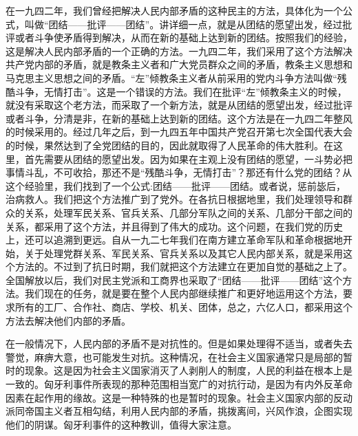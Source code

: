 在一九四二年，我们曾经把解决人民内部矛盾的这种民主的方法，具体化为一个公式，叫做“团结——批评——团结”。讲详细一点，就是从团结的愿望出发，经过批评或者斗争使矛盾得到解决，从而在新的基础上达到新的团结。按照我们的经验，这是解决人民内部矛盾的一个正确的方法。一九四二年，我们采用了这个方法解决共产党内部的矛盾，就是教条主义者和广大党员群众之间的矛盾，教条主义思想和马克思主义思想之间的矛盾。“左”倾教条主义者从前采用的党内斗争方法叫做“残酷斗争，无情打击”。这是一个错误的方法。我们在批评“左”倾教条主义的时候，就没有采取这个老方法，而采取了一个新方法，就是从团结的愿望出发，经过批评或者斗争，分清是非，在新的基础上达到新的团结。这个方法是在一九四二年整风的时候采用的。经过几年之后，到一九四五年中国共产党召开第七次全国代表大会的时候，果然达到了全党团结的目的，因此就取得了人民革命的伟大胜利。在这里，首先需要从团结的愿望出发。因为如果在主观上没有团结的愿望，一斗势必把事情斗乱，不可收拾，那还不是“残酷斗争，无情打击”？那还有什么党的团结？从这个经验里，我们找到了一个公式:团结——批评——团结。或者说，惩前毖后，治病救人。我们把这个方法推广到了党外。在各抗日根据地里，我们处理领导和群众的关系，处理军民关系、官兵关系、几部分军队之间的关系、几部分干部之间的关系，都采用了这个方法，并且得到了伟大的成功。这个问题，在我们党的历史上，还可以追溯到更远。自从一九二七年我们在南方建立革命军队和革命根据地开始，关于处理党群关系、军民关系、官兵关系以及其它人民内部关系，就是采用这个方法的。不过到了抗日时期，我们就把这个方法建立在更加自觉的基础之上了。全国解放以后，我们对民主党派和工商界也采取了“团结——批评——团结”这个方法。我们现在的任务，就是要在整个人民内部继续推广和更好地运用这个方法，要求所有的工厂、合作社、商店、学校、机关、团体，总之，六亿人口，都采用这个方法去解决他们内部的矛盾。

在一般情况下，人民内部的矛盾不是对抗性的。但是如果处理得不适当，或者失去警觉，麻痹大意，也可能发生对抗。这种情况，在社会主义国家通常只是局部的暂时的现象。这是因为社会主义国家消灭了人剥削人的制度，人民的利益在根本上是一致的。匈牙利事件所表现的那种范围相当宽广的对抗行动，是因为有内外反革命因素在起作用的缘故。这是一种特殊的也是暂时的现象。社会主义国家内部的反动派同帝国主义者互相勾结，利用人民内部的矛盾，挑拨离间，兴风作浪，企图实现他们的阴谋。匈牙利事件的这种教训，值得大家注意。

